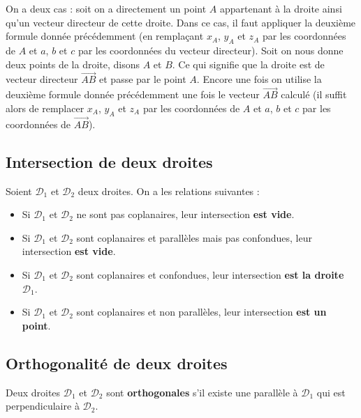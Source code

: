 	\begin{tip}
		On a deux cas : soit on a directement un point $A$ appartenant à la droite ainsi qu'un vecteur directeur de cette droite. Dans ce cas, il faut appliquer la deuxième formule donnée précédemment (en remplaçant $x_A$, $y_A$ et $z_A$ par les coordonnées de $A$ et $a$, $b$ et $c$ par les coordonnées du vecteur directeur).
		\newpar
		Soit on nous donne deux points de la droite, disons $A$ et $B$. Ce qui signifie que la droite est de vecteur directeur $\overrightarrow{AB}$ et passe par le point $A$. Encore une fois on utilise la deuxième formule donnée précédemment une fois le vecteur $\overrightarrow{AB}$ calculé (il suffit alors de remplacer $x_A$, $y_A$ et $z_A$ par les coordonnées de $A$ et $a$, $b$ et $c$ par les coordonnées de $\overrightarrow{AB}$).
	\end{tip}
	
	\subsection{Intersection de deux droites}
	
	\begin{formula}
		Soient $\mathcal{D}_1$ et $\mathcal{D}_2$ deux droites. On a les relations suivantes :
		\begin{itemize}
			\item Si $\mathcal{D}_1$ et $\mathcal{D}_2$ ne sont pas coplanaires, leur intersection \textbf{est vide}.
			\item Si $\mathcal{D}_1$ et $\mathcal{D}_2$ sont coplanaires et parallèles mais pas confondues, leur intersection \textbf{est vide}.
			\item Si $\mathcal{D}_1$ et $\mathcal{D}_2$ sont coplanaires et confondues, leur intersection \textbf{est la droite $\mathcal{D}_1$}.
			\item Si $\mathcal{D}_1$ et $\mathcal{D}_2$ sont coplanaires et non parallèles, leur intersection \textbf{est un point}.
		\end{itemize}
	\end{formula}
	
	\subsection{Orthogonalité de deux droites}
	
	\begin{formula}[Définition]
		Deux droites $\mathcal{D}_1$ et $\mathcal{D}_2$ sont \textbf{orthogonales} s'il existe une parallèle à $\mathcal{D}_1$ qui est perpendiculaire à $\mathcal{D}_2$.
	\end{formula}
	
